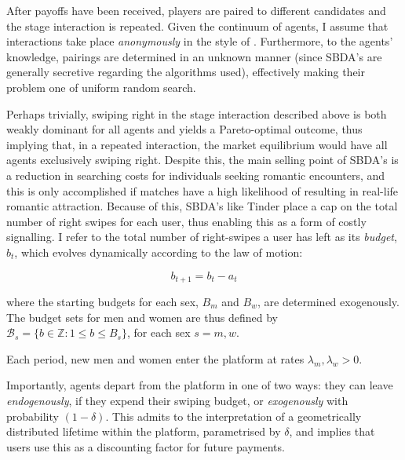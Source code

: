 After payoffs have been received, players are paired to different candidates and the stage interaction is repeated. Given the continuum of agents, I assume that interactions take place \textit{anonymously} in the style of \cite{jovanovic1988anonymous}. Furthermore, to the agents' knowledge, pairings are determined in an unknown manner (since SBDA's are generally secretive regarding the algorithms used), effectively making their problem one of uniform random search.

Perhaps trivially, swiping right in the stage interaction described above is both weakly dominant for all agents and yields a Pareto-optimal outcome, thus implying that, in a repeated interaction, the market equilibrium would have all agents exclusively swiping right. Despite this, the main selling point of SBDA's is a reduction in searching costs for individuals seeking romantic encounters, and this is only accomplished if matches have a high likelihood of resulting in real-life romantic attraction. Because of this, SBDA's like Tinder place a cap on the total number of right swipes for each user, thus enabling this as a form of costly signalling. I refer to the total number of right-swipes a user has left as its \textit{budget}, $b_t$, which evolves dynamically according to the law of motion:

\begin{equation*} 
  b_{t+1}= b_{t}- a_{t} 
\end{equation*}

where the starting budgets for each sex, $B_m$ and $B_w$, are determined exogenously. The budget sets for men and women are thus defined by $\mathcal{B}_{s}=\{b \in \mathbb{Z} : 1\leq b \leq B_s\}$, for each sex $s=m,w$. 

Each period, new men and women enter the platform at rates $\lambda_m, \lambda_w>0$.
\begin{comment}
    , with their attractiveness drawn i.i.d from distributions with cumulative distribution functions $F_m$ and $F_w$, respectively
\end{comment}
Importantly, agents depart from the platform in one of two ways: they can leave \textit{endogenously}, if they expend their swiping budget, or \textit{exogenously} with probability $(1-\delta)$. This admits to the interpretation of a geometrically distributed lifetime within the platform, parametrised by $\delta$, and implies that users use this as a discounting factor for future payments.

